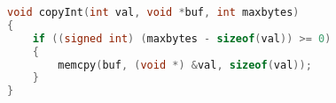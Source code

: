 {\begin{practicec}
    \end{practicec}

    \begin{practicec}

    \end{practicec}

    \begin{practicec}

    \end{practicec}

    \begin{practicec}

    \end{practicec}

    \begin{practicec}

    \end{practicec}

    \begin{practicec}

    \end{practicec}

    \begin{practicec}
        \begin{codelist}
            \begin{lstlisting}[language=C]
void copyInt(int val, void *buf, int maxbytes)
{
    if ((signed int) (maxbytes - sizeof(val)) >= 0)
    {
        memcpy(buf, (void *) &val, sizeof(val));
    }
}
            \end{lstlisting}
        \end{codelist}
    \end{practicec}

    \begin{practicec}

    \end{practicec}

    \begin{practicec}

    \end{practicec}

    \begin{practicec}

    \end{practicec}
}
